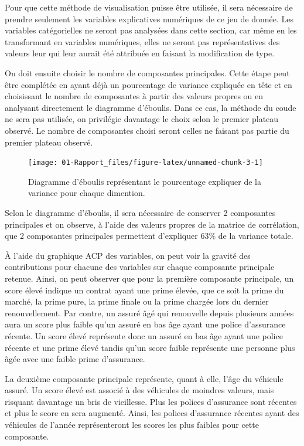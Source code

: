 \documentclass[
]{article}
\begin{document}
Pour que cette méthode de visualisation puisse être utilisée, il sera
nécessaire de prendre seulement les variables explicatives numériques de
ce jeu de donnée. Les variables catégorielles ne seront pas analysées
dans cette section, car même en les transformant en variables
numériques, elles ne seront pas représentatives des valeurs leur qui
leur aurait été attribuée en faisant la modification de type.

On doit ensuite choisir le nombre de composantes principales. Cette
étape peut être complétée en ayant déjà un pourcentage de variance
expliquée en tête et en choisissant le nombre de composantes à partir
des valeurs propres ou en analysant directement le diagramme d'éboulis.
Dans ce cas, la méthode du coude ne sera pas utilisée, on privilégie
davantage le choix selon le premier plateau observé. Le nombre de
composantes choisi seront celles ne faisant pas partie du premier
plateau observé.

\begin{figure}

{\centering \texttt{[image: 01-Rapport\_files/figure-latex/unnamed-chunk-3-1]} 

}

\caption{Diagramme d'éboulis représentant le pourcentage expliquer de la variance pour chaque dimention.}\label{fig:unnamed-chunk-3}
\end{figure}

Selon le diagramme d'éboulis, il sera nécessaire de conserver 2
composantes principales et on observe, à l'aide des valeurs propres de
la matrice de corrélation, que 2 composantes principales permettent
d'expliquer 63\% de la variance totale.

À l'aide du graphique ACP des variables, on peut voir la gravité des
contributions pour chacune des variables sur chaque composante
principale retenue. Ainsi, on peut observer que pour la première
composante principale, un score élevé indique un contrat ayant une prime
élevée, que ce soit la prime du marché, la prime pure, la prime finale
ou la prime chargée lors du dernier renouvellement. Par contre, un
assuré âgé qui renouvelle depuis plusieurs années aura un score plus
faible qu'un assuré en bas âge ayant une police d'assurance récente. Un
score élevé représente donc un assuré en bas âge ayant une police
récente et une prime élevé tandis qu'un score faible représente une
personne plus âgée avec une faible prime d'assurance.

La deuxième composante principale représente, quant à elle, l'âge du
véhicule assuré. Un score élevé est associé à des véhicules de moindres
valeurs, mais risquant davantage un bris de vieillesse. Plus les polices
d'assurance sont récentes et plus le score en sera augmenté. Ainsi, les
polices d'assurance récentes ayant des véhicules de l'année
représenteront les scores les plus faibles pour cette composante.
\end{document}

